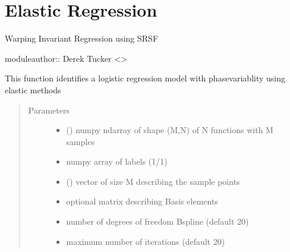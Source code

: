 \documentclass[letterpaper,10pt,english]{sphinxmanual}
\begin{document}
\chapter{Elastic Regression}
\label{\detokenize{regression:module-regression}}\label{\detokenize{regression:elastic-regression}}\label{\detokenize{regression::doc}}
Warping Invariant Regression using SRSF

moduleauthor:: Derek Tucker \textless{}\textgreater{}

\begin{fulllineitems}
\label{\detokenize{regression:regression.elastic_logistic}}
This function identifies a logistic regression model with
phase\sphinxhyphen{}variablity using elastic methods
\begin{quote}\begin{description}
\item[{Parameters}] \leavevmode\begin{itemize}
\item {} 
 () \textendash{} numpy ndarray of shape (M,N) of N functions with M samples

\item {} 
 \textendash{} numpy array of labels (1/\sphinxhyphen{}1)

\item {} 
 () \textendash{} vector of size M describing the sample points

\item {} 
 \textendash{} optional matrix describing Basis elements

\item {} 
 \textendash{} number of degrees of freedom B\sphinxhyphen{}spline (default 20)

\item {} 
 \textendash{} maximum number of iterations (default 20)


\end{itemize}
\end{description}
\end{quote}
\end{fulllineitems}
\end{document}
